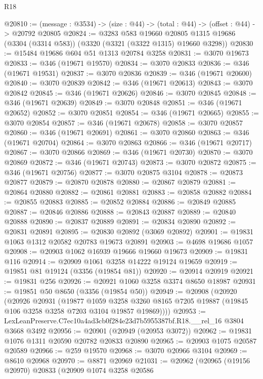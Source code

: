 \begin{lexlean}{R18}
\begin{coremodule}
@20810 := (message : @3534) -> (size : @44) -> (total : @44) -> (offset : @44) -> @20792 @20805
@20824 := @3283
    @583
    @19660
    @20805
    @1315
    @19686
    (@3304 (@3314 @583))
    (@3320 (@3321 (@3322 @1315) @19660 @3298))
@20830 := @15484 @19686 @604 @51 @1313 @20784 @3258
@20831 := @3070 @19673
@20833 := @346 (@19671 @19570)
@20834 := @3070 @20833
@20836 := @346 (@19671 @19531)
@20837 := @3070 @20836
@20839 := @346 (@19671 @20600)
@20840 := @3070 @20839
@20842 := @346 (@19671 @20613)
@20843 := @3070 @20842
@20845 := @346 (@19671 @20626)
@20846 := @3070 @20845
@20848 := @346 (@19671 @20639)
@20849 := @3070 @20848
@20851 := @346 (@19671 @20652)
@20852 := @3070 @20851
@20854 := @346 (@19671 @20665)
@20855 := @3070 @20854
@20857 := @346 (@19671 @20678)
@20858 := @3070 @20857
@20860 := @346 (@19671 @20691)
@20861 := @3070 @20860
@20863 := @346 (@19671 @20704)
@20864 := @3070 @20863
@20866 := @346 (@19671 @20717)
@20867 := @3070 @20866
@20869 := @346 (@19671 @20730)
@20870 := @3070 @20869
@20872 := @346 (@19671 @20743)
@20873 := @3070 @20872
@20875 := @346 (@19671 @20756)
@20877 := @3070 @20875 @3104
@20878 := @20873 @20877
@20879 := @20870 @20878
@20880 := @20867 @20879
@20881 := @20864 @20880
@20882 := @20861 @20881
@20883 := @20858 @20882
@20884 := @20855 @20883
@20885 := @20852 @20884
@20886 := @20849 @20885
@20887 := @20846 @20886
@20888 := @20843 @20887
@20889 := @20840 @20888
@20890 := @20837 @20889
@20891 := @20834 @20890
@20892 := @20831 @20891
@20895 := @20830 @20892 (@3069 @20892)
@20901 := @19831 @1063 @1312 @20582 @20783 @19673 @20891
@20903 := @4698 @19686 @1057
@20908 := @20903 @1062 @16939 @19666 @19660 @19673
@20909 := @19831 @116
@20914 := @20909 @1061 @3258 @14222 @19124 @19659
@20919 := @19851 @81 @19124 (@3356 (@19854 @81))
@20920 := @20914 @20919
@20921 := @19831 @256
@20926 := @20921 @1060 @3258 @3374 @8650 @18987
@20931 := @19851 @50 @8650 (@3356 (@19854 @50))
@20949 := @20908
    (@20920
      (@20926
        @20931
        (@19877
          @1059
          @3258
          @3260
          @8165
          @7205
          @19887
          (@19845 @106 @3258 @3258 @7203 @3104 @19857 @19869))))
@20953 := LexLeanPreserve.C7ec10a4ad3cb0f284e23d7b5955387bf.R18.__rel_16 @3804 @3668 @3492
@20956 := @20901 (@20949 (@20953 @3072))
@20962 := @19831 @1076 @1311 @20590 @20782 @20833 @20890
@20965 := @20903 @1075 @20587 @20589
@20966 := @259 @19570
@20968 := @3070 @20966 @3104
@20969 := @8610 @20968
@20970 := @8871 @20969
@21031 := @20962
    (@20965
      (@19156 @20970)
      @20833
      (@20909
        @1074
        @3258
        @20586

\end{coremodule}
\end{lexlean}
